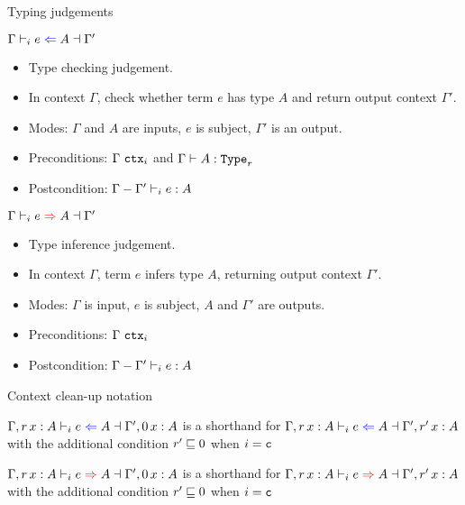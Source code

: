\begin{frame}{Typing judgements}

$\checktype{\Gamma}{e}{A}{\Gamma'}$
\begin{itemize}
  \item Type checking judgement.
  \item In context $\Gamma$, check whether term $e$ has type $A$ and return output context $\Gamma'$.
  \item Modes: $\Gamma$ and $A$ are inputs, $e$ is subject, $\Gamma'$ is an output.
  \item Preconditions: $\ctx{\Gamma}$ and $\type[\Gamma]{A}[r]$
  \item Postcondition: $\typing[\subctx{\Gamma}{\Gamma'}]{e}{A}$
\end{itemize}

\vspace{1em}

$\infertype{\Gamma}{e}{A}{\Gamma'}$
\begin{itemize}
  \item Type inference judgement.
  \item In context $\Gamma$, term $e$ infers type $A$, returning output context $\Gamma'$.
  \item Modes: $\Gamma$ is input, $e$ is subject, $A$ and $\Gamma'$ are outputs.
  \item Preconditions: $\ctx{\Gamma}$
  \item Postcondition: $\typing[\subctx{\Gamma}{\Gamma'}]{e}{A}$
\end{itemize}

\end{frame}

\begin{frame}{Context clean-up notation}

$\checktype{\extend{\Gamma}[r]{x}{A}}{e}{A}{\extend{\Gamma'}[\Zero]{x}{A}}$ is a shorthand for $\checktype{\extend{\Gamma}[r]{x}{A}}{e}{A}{\extend{\Gamma'}[r']{x}{A}}$ with the additional condition $r' \sqsubseteq 0$ when $i = \texttt{c}$

\vspace{2em}

$\infertype{\extend{\Gamma}[r]{x}{A}}{e}{A}{\extend{\Gamma'}[\Zero]{x}{A}}$ is a shorthand for $\infertype{\extend{\Gamma}[r]{x}{A}}{e}{A}{\extend{\Gamma'}[r']{x}{A}}$ with the additional condition $r' \sqsubseteq 0$ when $i = \texttt{c}$

\end{frame}

